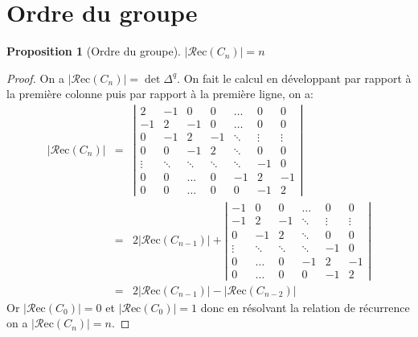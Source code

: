 \documentclass{report}
\newtheorem{property}[theorem]{Proposition}
\newcommand{\recu}[1]{\ensuremath{\mathcal{R}\text{ec}(#1)}}
\newcommand{\card}[1]{\ensuremath{|#1|}}
\begin{document}
\section{Ordre du groupe}
\begin{property}[Ordre du groupe]
$\card{\recu{C_{n}}} = n$
\end{property}
\begin{proof}
On a $\card{\recu{C_n}} = \det\Delta^q$. On fait le calcul
en développant par rapport à la première colonne puis par rapport à la première ligne, on a:
\begin{eqnarray}
\card{\recu{C_n}} &=& \left|\begin{array}{rrrrrrr}
2 & -1 & 0 & 0 & \hdots & 0 & 0 \\
-1 & 2 & -1 & 0 & \hdots & 0 & 0 \\
0 & -1 & 2 & -1 & \ddots & \vdots & \vdots \\
0 & 0 & -1 & 2 & \ddots & 0 & 0 \\
\vdots & \ddots & \ddots & \ddots & \ddots & -1 & 0 \\
0 & 0 & \hdots & 0 & -1 & 2 & -1 \\
0 & 0 & \hdots & 0 & 0 & -1 & 2
\end{array}\right| \\
&=& 2 \card{\recu{C_{n-1}}} + 
\left|\begin{array}{rrrrrrr}
-1 & 0 & 0 & \hdots & 0 & 0 \\
-1 & 2 & -1 & \ddots & \vdots & \vdots \\
0 & -1 & 2 & \ddots & 0 & 0 \\
\vdots & \ddots & \ddots & \ddots & -1 & 0 \\
0 & \hdots & 0 & -1 & 2 & -1 \\
0 & \hdots & 0 & 0 & -1 & 2
\end{array}\right| \\
&=& 2 \card{\recu{C_{n-1}}} - \card{\recu{C_{n-2}}}
\end{eqnarray}
Or $\card{\recu{C_{0}}} = 0$ et $\card{\recu{C_{0}}} = 1$ donc en résolvant la relation de récurrence on a $\card{\recu{C_{n}}} = n$.
\end{proof}
\end{document}
